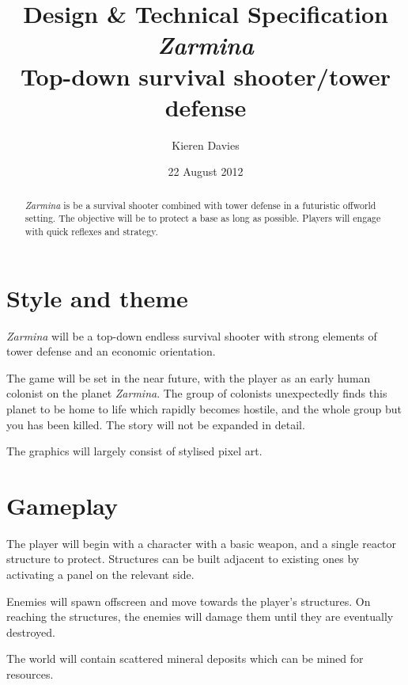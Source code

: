 \documentclass[a4paper]{article}
\begin{document}
\title{Design \& Technical Specification \\ \vspace{0.5em}
       \emph{Zarmina} \\ \vspace{1em}
       \large{Top-down survival shooter/tower defense}}
\author{Kieren Davies}
\date{22 August 2012}
\maketitle

\renewcommand{\abstractname}{Executive summary}
\begin{abstract}
\emph{Zarmina} is be a survival shooter combined with tower defense in a futuristic offworld setting.  The objective will be to protect a base as long as possible.  Players will engage with quick reflexes and strategy.
\end{abstract}
\newpage

\section{Style and theme}

\emph{Zarmina} will be a top-down endless survival shooter with strong elements of tower defense and an economic orientation.

The game will be set in the near future, with the player as an early human colonist on the
planet \emph{Zarmina}.  The group of colonists unexpectedly finds this planet to be home to life which rapidly becomes hostile, and the whole group but you has been killed.  The story will not be expanded in detail.

The graphics will largely consist of stylised pixel art.

\section{Gameplay}

The player will begin with a character with a basic weapon, and a single reactor structure to protect.  Structures can be built adjacent to existing ones by activating a panel on the relevant side.

Enemies will spawn offscreen and move towards the player's structures.  On reaching the structures, the enemies will damage them until they are eventually destroyed.

The world will contain scattered mineral deposits which can be mined for resources.
\end{document}
